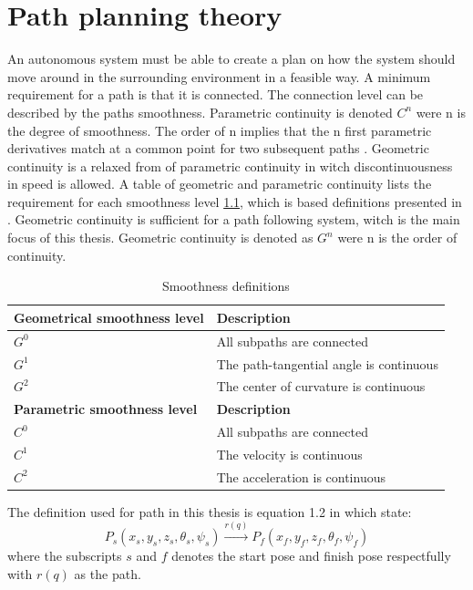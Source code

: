 \chapter{Path planning theory}
An autonomous system must be able to create a plan on how the system should move around in the surrounding environment in a feasible way. A minimum requirement for a path is that it is connected. The connection level can be described by the paths smoothness.
Parametric continuity is denoted $C^n$ were n is the degree of smoothness. The order of n implies that the n first parametric derivatives match at a common point for two subsequent paths \citep{barsky1989geometric}. Geometric continuity is a relaxed from of parametric continuity in witch discontinuousness in speed is allowed. A table of geometric and parametric continuity lists the requirement for each smoothness level \ref{TB:SmoothnessDescriptions}, which is based definitions presented in \citep{barsky1989geometric}.
Geometric continuity is sufficient for a path following system, witch is the main focus of this thesis. Geometric continuity is denoted as $G^n$ were n is the order of continuity.

\begin{table}[H]
\begin{center}
\begin{tabular}{| l | | l |}
\hline
\textbf{Geometrical smoothness level} & \textbf{Description} \\ \hline
$G^0$ & All subpaths are connected \\ \hline
$G^1$ & The path-tangential angle is continuous \\ \hline
$G^2$ & The center of curvature is continuous \\ \hline
\textbf{Parametric smoothness level} & \textbf{Description} \\ \hline
$C^0$ & All subpaths are connected \\ \hline
$C^1$ & The velocity is continuous \\ \hline
$C^2$ & The acceleration is continuous \\ \hline
\end{tabular}
\end{center}
\caption{Smoothness definitions}
\label{TB:SmoothnessDescriptions}
\end{table} 

The definition used for path in this thesis is equation 1.2 in \citep{tsourdos2010cooperative} which state:
\begin{equation}
P_s(x_s,y_s,z_s,\theta_s,\psi_s) \xrightarrow{r(q)} P_f(x_f,y_f,z_f,\theta_f,\psi_f)
\end{equation}
where the subscripts $s$ and $f$ denotes the start pose and finish pose respectfully with $r(q)$ as the path.

